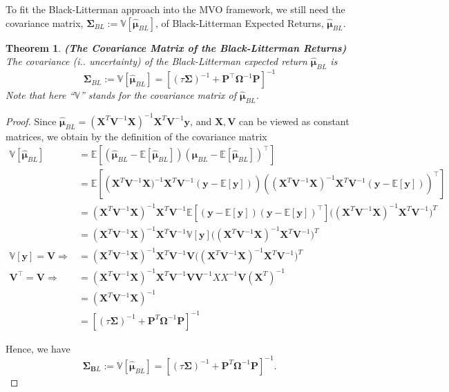 \documentclass[13pt]{article}
\newtheorem{theorem}{Theorem}[section]
\theoremstyle{definition}
\theoremstyle{remark}
\begin{document}
To fit the Black-Litterman approach into the MVO framework, we still need the covariance matrix, $\mathbf{\Sigma}_{BL}:=\mathbb{V}[\bm{\hat{\bm{\mu}}}_{BL}]$, of Black-Litterman Expected Returns, $\bm{\hat{\bm{\mu}}}_{BL}$.

\begin{theorem} \textbf{(The Covariance Matrix
of the Black-Litterman Returns)}
The covariance (i.. uncertainty) of the Black-Litterman expected return
$\bm{\hat{\bm{\mu}}}_{BL}$ is 
$$
\mathbf{\Sigma}_{BL}:=\mathbb{V}\left[\bm{\hat{\bm{\mu}}}_{BL}\right]=\left[(\tau \mathbf{\Sigma})^{-1}+\mathbf{P}^\top \mathbf{\Omega}^{-1} \mathbf{P}\right]^{-1}
$$
Note that here ``$\mathbb{V}$'' stands for the covariance matrix of $\bm{\hat{\bm{\mu}}}_{BL}$.
\end{theorem}
\begin{proof}
    Since $\bm{\hat{\bm{\mu}}}_{BL} = (\mathbf{X}^T\mathbf{V}^{-1}\mathbf{X})^{-1}\mathbf{X}^T\mathbf{V}^{-1}\bm{y}$, and $\mathbf{X},\mathbf{V}$ can be viewed as constant matrices, we obtain by the definition of the covariance matrix 
\begin{align*}
    \mathbb{V}[\bm{\hat{\bm{\mu}}}_{BL}] 
    &= \mathbb{E}[(\bm{\hat{\bm{\mu}}}_{BL}-\mathbb{E}[\bm{\hat{\bm{\mu}}}_{BL}])(\bm{\hat{\bm{\mu}}}_{BL}-\mathbb{E}[\bm{\hat{\bm{\mu}}}_{BL}])^\top]\\
    &=\mathbb{E}\left[\left(\mathbf{X}^T\mathbf{V}^{-1}\mathbf{X})^{-1}\mathbf{X}^T\mathbf{V}^{-1}(\bm{y}-\mathbb{E}[\bm{y}])\right)\left((\mathbf{X}^T\mathbf{V}^{-1}\mathbf{X})^{-1}\mathbf{X}^T\mathbf{V}^{-1}(\bm{y}-\mathbb{E}[\bm{y}])\right)^\top\right]\\
    &=(\mathbf{X}^T\mathbf{V}^{-1}\mathbf{X})^{-1}\mathbf{X}^T\mathbf{V}^{-1}\mathbb{E}[(\bm{y}-\mathbb{E}[\bm{y}])(\bm{y}-\mathbb{E}[\bm{y}])^\top]\Big((\mathbf{X}^T\mathbf{V}^{-1}\mathbf{X})^{-1}\mathbf{X}^T\mathbf{V}^{-1}\Big)^T\\
    &=(\mathbf{X}^T\mathbf{V}^{-1}\mathbf{X})^{-1}\mathbf{X}^T\mathbf{V}^{-1}\mathbb{V}[\bm{y}]\Big((\mathbf{X}^T\mathbf{V}^{-1}\mathbf{X})^{-1}\mathbf{X}^T\mathbf{V}^{-1}\Big)^T\\
    \mathbb{V}[\bm{y}] =\mathbf{V} \Longrightarrow&= (\mathbf{X}^T\mathbf{V}^{-1}\mathbf{X})^{-1}\mathbf{X}^T\mathbf{V}^{-1}\mathbf{V}\Big((\mathbf{X}^T\mathbf{V}^{-1}\mathbf{X})^{-1}\mathbf{X}^T\mathbf{V}^{-1}\Big)^T\\
    \mathbf{V}^\top =\mathbf{V} \Longrightarrow&= (\mathbf{X}^T\mathbf{V}^{-1}\mathbf{X})^{-1}\mathbf{X}^T\mathbf{V}^{-1}\mathbf{V}\mathbf{V}^{-1}XX^{-1}\mathbf{V}(\mathbf{X}^T)^{-1}\\
    &=(\mathbf{X}^T\mathbf{V}^{-1}\mathbf{X})^{-1} \\
    &= [(\tau \mathbf{\Sigma})^{-1} + \mathbf{P}^T\mathbf{\Omega}^{-1}\mathbf{P}]^{-1}
\end{align*}

Hence, we have 
\[
\mathbf{\Sigma}_{\mathbf{B} L}:=\mathbb{V}[\bm{\hat{\bm{\mu}}}_{BL}] = [(\tau \mathbf{\Sigma})^{-1} + \mathbf{P}^T\mathbf{\Omega}^{-1}\mathbf{P}]^{-1}.
\]
\end{proof}
\end{document}
